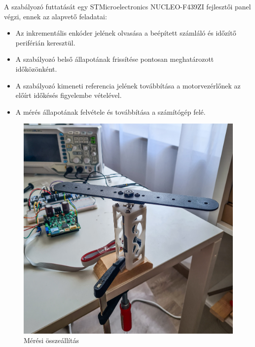 A szabályozó futtatását egy STMicroelectronics NUCLEO-F439ZI fejlesztői panel végzi, ennek az alapvető feladatai:
\begin{itemize}
    \item Az inkrementális enkóder jelének olvasása a beépített számláló és időzítő periférián keresztül.
    \item A szabályozó belső állapotának frissítése pontosan meghatározott időközönként.
    \item A szabályozó kimeneti referencia jelének továbbítása a motorvezérlőnek az előírt időkésés figyelembe vételével.
    \item A mérés állapotának felvétele és továbbítása a számítógép felé.
\end{itemize}

\begin{figure}[b!]
	\begin{center}
		\includegraphics[width=14cm]{images/setup_experiment.jpg}
		\caption{Mérési összeállítás}\label{fig:setup_experiment}
	\end{center}
\end{figure}


